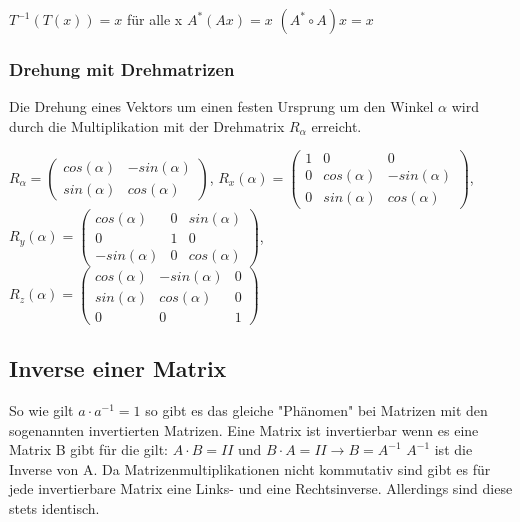 \documentclass[11pt,a4paper,onecolumn]{article}
\begin{document}
\begin{flushleft}
$ T^{-1}(T(x)) = x $ für alle x\linebreak
$ A^{*} (Ax) = x $\linebreak
$ (A^{*} \circ A)x = x $\linebreak

\subsubsection{Drehung mit Drehmatrizen}
Die Drehung eines Vektors um einen festen Ursprung um den Winkel $\alpha$ wird durch die Multiplikation mit der Drehmatrix $R_{\alpha}$ erreicht.\linebreak

$
R_{\alpha} = \begin{pmatrix}
    cos(\alpha) & -sin(\alpha) \\
    sin(\alpha) & cos(\alpha)
\end{pmatrix}
$,
$
R_{x}(\alpha) = \begin{pmatrix}
    1 & 0 & 0 \\
    0 & cos(\alpha) & -sin(\alpha) \\
    0 & sin(\alpha) & cos(\alpha)
\end{pmatrix}
$,
$
R_{y}(\alpha) = \begin{pmatrix}
    cos(\alpha) & 0 & sin(\alpha) \\
    0 & 1 & 0 \\
    -sin(\alpha) & 0 & cos(\alpha)
\end{pmatrix}
$,
$
R_{z}(\alpha) = \begin{pmatrix}
    cos(\alpha) & -sin(\alpha) & 0 \\
    sin(\alpha) & cos(\alpha) & 0 \\
    0 & 0 & 1
\end{pmatrix}
$
\subsection{Inverse einer Matrix}
So wie gilt $a \cdot a^{-1} = 1$ so gibt es das gleiche "Phänomen" bei Matrizen mit den sogenannten invertierten Matrizen. Eine Matrix ist invertierbar wenn es eine Matrix B gibt für die gilt:\linebreak \linebreak
$ A \cdot B = II $ und $ B \cdot A = II  \longrightarrow B = A^{-1} $ \linebreak \linebreak
$A^{-1} $ ist die Inverse von A. Da Matrizenmultiplikationen nicht kommutativ sind gibt es für jede invertierbare Matrix eine Links- und eine Rechtsinverse. Allerdings sind diese stets identisch.\linebreak


\end{flushleft}
\end{document}
